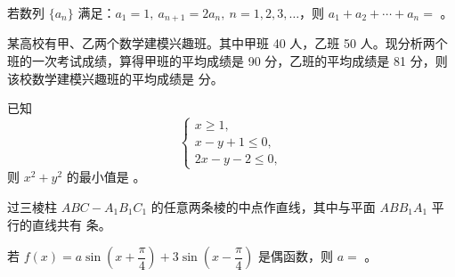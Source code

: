 \begin{question}
若数列 $\{a_n\}$ 满足：$a_1=1,\ a_{n+1}=2a_n,\ n=1,2,3,\ldots$，则 $a_1+a_2+\cdots+a_n=$ \gkblank{}。

\end{question}
\begin{question}
某高校有甲、乙两个数学建模兴趣班。其中甲班 40 人，乙班 50 人。现分析两个班的一次考试成绩，算得甲班的平均成绩是 90 分，乙班的平均成绩是 81 分，则该校数学建模兴趣班的平均成绩是 \gkblank{} 分。

\end{question}
\begin{question}
已知
\nopagebreak[4]
\[
\begin{cases}
x\geqslant1,\\
x-y+1\leqslant0,\\
2x-y-2\leqslant0,
\end{cases}
\]
则 $x^2+y^2$ 的最小值是 \gkblank{}。

\end{question}
\begin{question}
过三棱柱 $ABC-A_1B_1C_1$ 的任意两条棱的中点作直线，其中与平面 $ABB_1A_1$ 平行的直线共有 \gkblank{} 条。

\end{question}
\begin{question}
若 $f(x)=a\sin\left(x+\dfrac{\pi}{4}\right)+3\sin\left(x-\dfrac{\pi}{4}\right)$ 是偶函数，则 $a=$ \gkblank{}。

\end{question}

